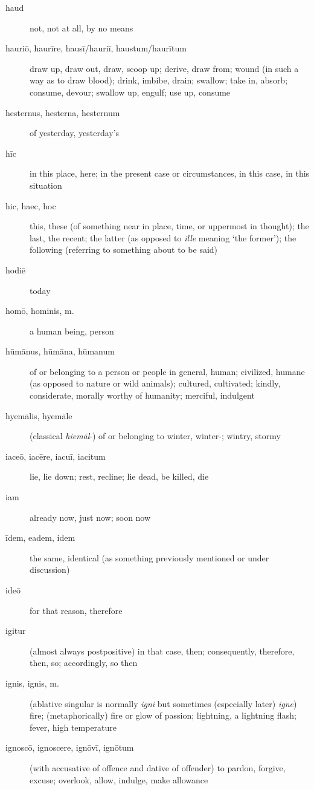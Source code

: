 \begin{description}
    \item[haud] \marginnote{*}not, not at all, by no means
    \item[hauriō, haurīre, hausī/hauriī, haustum/haurītum] draw up, draw out, draw, scoop up; derive, draw from; wound (in such a way as to draw blood); drink, imbibe, drain; swallow; take in, absorb; consume, devour; swallow up, engulf; use up, consume
    \item[hesternus, hesterna, hesternum] of yesterday, yesterday's
    \item[hīc] \marginnote{*}in this place, here; in the present case or circumstances, in this case, in this situation
    \item[hic, haec, hoc] \marginnote{*}this, these (of something near in place, time, or uppermost in thought); the last, the recent; the latter (as opposed to \textit{ille} meaning `the former'); the following (referring to something about to be said)
    \item[hodiē] \marginnote{*}today
    \item[homō, hominis, m.] \marginnote{*}a human being, person
    \item[hūmānus, hūmāna, hūmanum] \marginnote{*}of or belonging to a person or people in general, human; civilized, humane (as opposed to nature or wild animals); cultured, cultivated; kindly, considerate, morally worthy of humanity; merciful, indulgent
    \item[hyemālis, hyemāle] (classical \textit{hiemāl}-) of or belonging to winter, winter-; wintry, stormy
    \item[iaceō, iacēre, iacuī, iacitum] \marginnote{*}lie, lie down; rest, recline; lie dead, be killed, die
    \item[iam] \marginnote{*}already now, just now; soon now
    \item[īdem, eadem, idem] \marginnote{*}the same, identical (as something previously mentioned or under discussion)
    \item[ideō] \marginnote{*}for that reason, therefore
    \item[igitur] \marginnote{*}(almost always postpositive) in that case, then; consequently, therefore, then, so; accordingly, so then
    \item[ignis, ignis, m.] \marginnote{*}(ablative singular is normally \textit{igni} but sometimes (especially later) \textit{igne}) fire; (metaphorically) fire or glow of passion; lightning, a lightning flash; fever, high temperature
    \item[ignoscō, ignoscere, ignōvī, ignōtum] (with accusative of offence and dative of offender) to pardon, forgive, excuse; overlook, allow, indulge, make allowance

\end{description}
